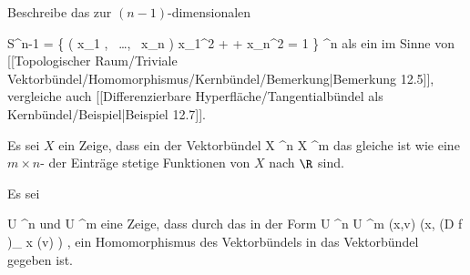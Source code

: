 {}
{

Beschreibe das
zur $(n-1 )$-dimensionalen

\mavergleichskettedisp
{\vergleichskette
{ S^{n-1}
}
{ =} { \left\{  \left(  x_1   , \,   \ldots  , \,   x_n          \right)   \mid   x_1^2 + \cdots + x_n^2 = 1         \right\}
}
{ \subset} { \R^n
}
{ } {
}
{ } {
}
}
{}{}{}
als ein
im Sinne von
[[Topologischer Raum/Triviale Vektorbündel/Homomorphismus/Kernbündel/Bemerkung|Bemerkung 12.5]],
vergleiche auch
[[Differenzierbare Hyperfläche/Tangentialbündel als Kernbündel/Beispiel|Beispiel 12.7]].

}
{} {}

{}
{

Es sei $X$ ein
Zeige, dass ein
der
 {} {}
Vektorbündel
\maabbdisp {\varphi} {X \times \R^n } { X \times \R^m
} {}
das gleiche ist wie eine
$m \times n$-
der Einträge stetige Funktionen von $X$ nach $\R$ sind.

}
{} {}

{}
{

Es sei

\mavergleichskette
{\vergleichskette
{U
}
{ \subseteq }{ \R^n
}
{  }{
}
{    }{
}
{   }{
}
}
{}{}{}
und
 { U } { \R^m
} {}
eine
Zeige, dass durch das
in der Form
\maabbeledisp {} { U \times \R^n } { U \times \R^m
} { (x,v)} { (x, \left(D f \right)_{ x} (v) )
} {,}
ein Homomorphismus des Vektorbündels
 in das Vektorbündel
  gegeben ist.

}
{} {}

